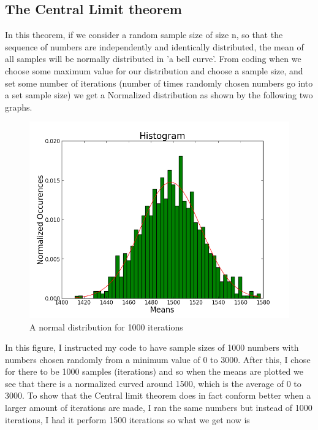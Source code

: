 \documentclass[12 pt]{article}
\begin{document}
\subsection{The Central Limit theorem}
In this theorem, if we consider a random sample size of size n, so that
the sequence of numbers are independently and identically distributed,
the mean of all samples will be normally distributed in 'a bell curve'.
From coding when we choose some maximum value for our distribution and
choose a sample size, and set some number of iterations (number of times
randomly chosen numbers go into a set sample size) we get a Normalized
distribution as shown by the following two graphs. 
\begin{figure}[H]
\center
\includegraphics[scale=.6]{central_limit_3.png}
\caption{A normal distribution for 1000 iterations}
\label{central1}
\end{figure}
In this figure, I instructed my code to have sample sizes of 1000
numbers with numbers chosen randomly from a minimum value of 0 to
3000. After this, I chose for there to be 1000 samples (iterations) and
so when the means are plotted we see that there is a normalized curved
around 1500, which is the average of 0 to 3000. To show that the Central
limit theorem does in fact conform better when a larger amount of
iterations are made, I ran the same numbers but instead of 1000
iterations, I had it perform 1500 iterations so what we get now is 
\end{document}

